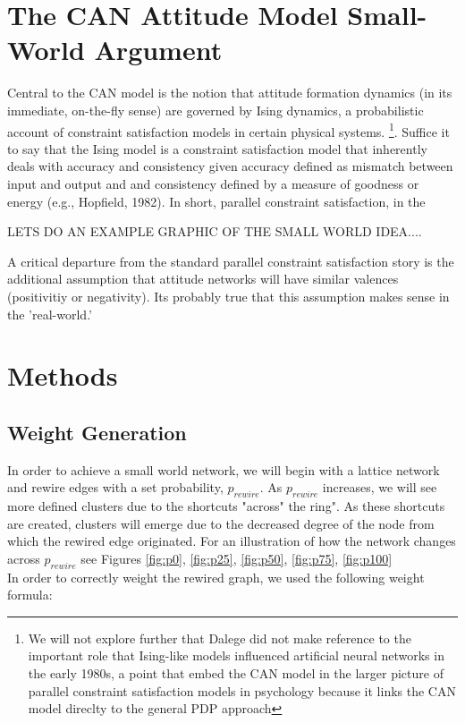 \documentclass{article}
\begin{document}
\section{The CAN Attitude Model Small-World Argument}
\label{sec:sim}
Central to the CAN model is the notion that attitude formation dynamics (in its immediate, on-the-fly sense) are governed by Ising dynamics, a probabilistic account of constraint satisfaction models in certain physical systems.  \footnote{We will not explore further that Dalege did not make reference to the important role that Ising-like models influenced artificial neural networks in the early 1980s, a point that embed the CAN model in the larger picture of parallel constraint satisfaction models in psychology because it links the CAN model direclty to the general PDP approach}.  Suffice it to say that the Ising model is a constraint satisfaction model that inherently deals with accuracy and consistency given accuracy defined as mismatch between input and output and and consistency defined by a measure of goodness or energy (e.g., Hopfield, 1982).  In short, parallel constraint satisfaction, in the 

LETS DO AN EXAMPLE GRAPHIC OF THE SMALL WORLD IDEA....

A critical departure from the standard parallel constraint satisfaction story is the additional assumption that attitude networks will have similar valences (positivitiy or negativity).  Its probably true that this assumption makes sense in the 'real-world.'  











\section{Methods}

\subsection{Weight Generation}
In order to achieve a small world network, we will begin with a lattice network and rewire edges with a set probability, $p_{rewire}$. As $p_{rewire}$ increases, we will see more defined clusters due to the shortcuts "across" the ring". As these shortcuts are created, clusters will emerge due to the decreased degree of the node from which the rewired edge originated. For an illustration of how the network changes across $p_{rewire}$ see Figures \ref{fig:p0}, \ref{fig:p25}, \ref{fig:p50}, \ref{fig:p75}, \ref{fig:p100}
\\
In order to correctly weight the rewired graph, we used the following weight formula:
\end{document}
